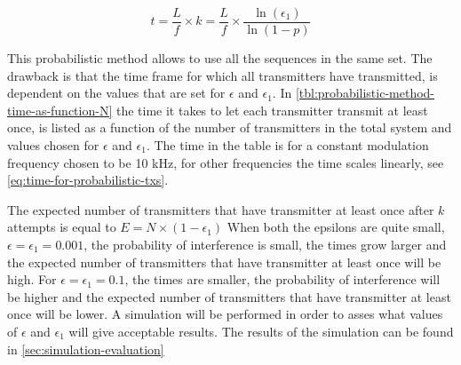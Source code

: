 \begin{equation}
	\label{eq:time-for-probabilistic-txs}
	t = \frac{L}{f} \times k = \frac{L}{f} \times \frac{\ln(\epsilon_1)}{\ln(1 - p)}
\end{equation}

This probabilistic method allows to use all the sequences in the same set.
The drawback is that the time frame for which all transmitters have transmitted, is dependent on the values that are set for $\epsilon$ and $\epsilon_1$.
In \autoref{tbl:probabilistic-method-time-as-function-N} the time it takes to let each transmitter transmit at least once, is listed as a function of the number of transmitters in the total system and values chosen for $\epsilon$ and $\epsilon_1$. 
The time in the table is for a constant modulation frequency chosen to be 10 kHz, for other frequencies the time scales linearly, see \autoref{eq:time-for-probabilistic-txs}.

The expected number of transmitters that have transmitter at least once after $k$ attempts is equal to $E = N \times (1 - \epsilon_1)$
When both the epsilons are quite small, $\epsilon = \epsilon_1 = 0.001$, the probability of interference is small, the times grow larger and the expected number of transmitters that have transmitter at least once will be high. 
For $\epsilon = \epsilon_1 = 0.1$, the times are smaller, the probability of interference will be higher and the expected number of transmitters that have transmitter at least once will be lower. 
A simulation will be performed in order to asses what values of $\epsilon$ and $\epsilon_1$ will give acceptable results.
The results of the simulation can be found in \autoref{sec:simulation-evaluation}




